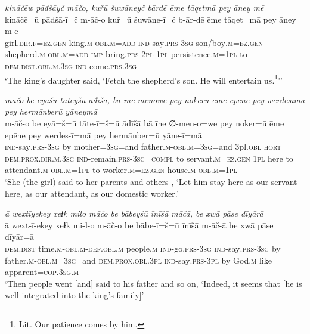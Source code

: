 \ea \label{KŠ.40}
\textit{kināčēw pāđšāyč māčo, kuřū šuwāneyč bārdē ēme tāqetmā pey āney mē} \\ 
\gll kināčē=ū pāđšā-ī=č m-āč-o kuř=ū šuwāne-ī=č b-ār-dē ēme tāqet=mā pey āney m-ē \\ 
 girl\textsc{.dir}\textsc{.f}\textsc{=ez.gen} king\textsc{.m}\textsc{-obl}\textsc{.m}\textsc{=add} \textsc{ind-}say\textsc{.prs}\textsc{-3sg} son/boy\textsc{.m}\textsc{=ez.gen} shepherd\textsc{.m}\textsc{-obl}\textsc{.m}\textsc{=add} \textsc{imp-}bring\textsc{.prs}-\textsc{2pl} \textsc{1pl} persistence\textsc{.m}\textsc{=\textsc{1pl}} to \textsc{dem.dist}\textsc{.obl}\textsc{.m}\textsc{.3sg} \textsc{ind-}come\textsc{.prs}\textsc{.3sg} \\ 
\glt `The king’s daughter said, ‘Fetch the shepherd’s son. He will entertain us.\footnote{Lit. Our patience comes by him.}’'
\z 
 
\ea \label{KŠ.43}
\textit{māčo be eyāšū tāteyšū āđīšā, bā īne menowe pey nokerū ēme epēne pey werdesīmā pey hermānberū yāneymā} \\ 
\gll m-āč-o be eyā=š=ū tāte-ī=š=ū āđīšā bā īne ∅-men-o=we pey noker=ū ēme epēne pey werdes-ī=mā pey hermānber=ū yāne-ī=mā \\ 
 \textsc{ind-}say\textsc{.prs}\textsc{-3sg} by mother\textsc{=3sg}=and father\textsc{.m}\textsc{-obl}\textsc{.m}\textsc{=3sg}=and 3pl\textsc{.obl} \textsc{hort} \textsc{dem.prox}\textsc{.dir}\textsc{.m}\textsc{.3sg} \textsc{ind-}remain\textsc{.prs}\textsc{-3sg}\textsc{=compl} to servant\textsc{.m}\textsc{=ez.gen} \textsc{1pl} here to attendant\textsc{.m}\textsc{-obl}\textsc{.m}\textsc{=\textsc{1pl}} to worker\textsc{.m}\textsc{=ez.gen} house\textsc{.m}\textsc{-obl}\textsc{.m}\textsc{=\textsc{1pl}} \\ 
\glt `She (the girl) said to her parents and others , ‘Let him stay here as our servant here, as our attendant, as our domestic worker.'
\z 
 
\ea \label{KŠ.46}
\textit{ā wextīyekey xeɫk milo māčo be bābeyšū īnīšā māčā, be xwā pāse dīyārā} \\ 
\gll ā wext-ī-ekey xeɫk mi-l-o m-āč-o be bābe-ī=š=ū īnīšā m-āč-ā be xwā pāse dīyār=ā \\ 
 \textsc{dem.dist} time\textsc{.m}\textsc{-obl}\textsc{.m}\textsc{-def}\textsc{.obl}\textsc{.m} people\textsc{.m} \textsc{ind-}go\textsc{.prs}\textsc{-3sg} \textsc{ind-}say\textsc{.prs}\textsc{-3sg} by father\textsc{.m}\textsc{-obl}\textsc{.m}\textsc{=3sg}=and \textsc{dem.prox}\textsc{.obl}\textsc{.3pl} \textsc{ind-}say\textsc{.prs}\textsc{-3pl} by God\textsc{.m} like apparent\textsc{=cop}\textsc{.3sg}\textsc{.m} \\ 
\glt `Then people went [and] said to his father and so on, ‘Indeed, it seems that [he is well-integrated into the king’s family]'
\z 
 

